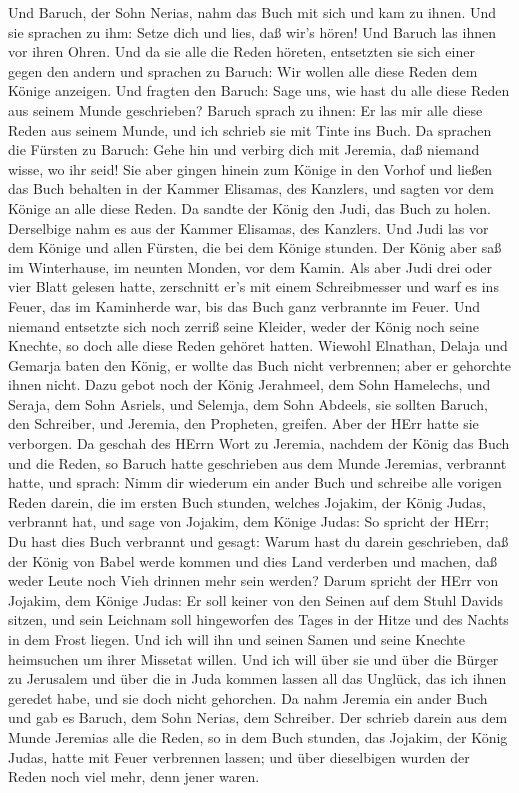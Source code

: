 Und Baruch, der Sohn Nerias, nahm das Buch mit sich und kam zu ihnen.
 Und sie sprachen zu ihm: Setze dich und lies, daß wir's
hören! Und Baruch las ihnen vor ihren Ohren.  Und da sie
alle die Reden höreten, entsetzten sie sich einer gegen den andern und
sprachen zu Baruch: Wir wollen alle diese Reden dem Könige anzeigen.
 Und fragten den Baruch: Sage uns, wie hast du alle diese
Reden aus seinem Munde geschrieben?  Baruch sprach zu
ihnen: Er las mir alle diese Reden aus seinem Munde, und ich schrieb sie
mit Tinte ins Buch.  Da sprachen die Fürsten zu Baruch:
Gehe hin und verbirg dich mit Jeremia, daß niemand wisse, wo ihr seid!
 Sie aber gingen hinein zum Könige in den Vorhof und ließen
das Buch behalten in der Kammer Elisamas, des Kanzlers, und sagten vor
dem Könige an alle diese Reden.  Da sandte der König den
Judi, das Buch zu holen. Derselbige nahm es aus der Kammer Elisamas, des
Kanzlers. Und Judi las vor dem Könige und allen Fürsten, die bei dem
Könige stunden.  Der König aber saß im Winterhause, im
neunten Monden, vor dem Kamin.  Als aber Judi drei oder
vier Blatt gelesen hatte, zerschnitt er's mit einem Schreibmesser und
warf es ins Feuer, das im Kaminherde war, bis das Buch ganz verbrannte
im Feuer.  Und niemand entsetzte sich noch zerriß seine
Kleider, weder der König noch seine Knechte, so doch alle diese Reden
gehöret hatten.  Wiewohl Elnathan, Delaja und Gemarja baten
den König, er wollte das Buch nicht verbrennen; aber er gehorchte ihnen
nicht.  Dazu gebot noch der König Jerahmeel, dem Sohn
Hamelechs, und Seraja, dem Sohn Asriels, und Selemja, dem Sohn Abdeels,
sie sollten Baruch, den Schreiber, und Jeremia, den Propheten, greifen.
Aber der HErr hatte sie verborgen.  Da geschah des HErrn
Wort zu Jeremia, nachdem der König das Buch und die Reden, so Baruch
hatte geschrieben aus dem Munde Jeremias, verbrannt hatte, und sprach:
 Nimm dir wiederum ein ander Buch und schreibe alle vorigen
Reden darein, die im ersten Buch stunden, welches Jojakim, der König
Judas, verbrannt hat,  und sage von Jojakim, dem Könige
Judas: So spricht der HErr; Du hast dies Buch verbrannt und gesagt:
Warum hast du darein geschrieben, daß der König von Babel werde kommen
und dies Land verderben und machen, daß weder Leute noch Vieh drinnen
mehr sein werden?  Darum spricht der HErr von Jojakim, dem
Könige Judas: Er soll keiner von den Seinen auf dem Stuhl Davids sitzen,
und sein Leichnam soll hingeworfen des Tages in der Hitze und des Nachts
in dem Frost liegen.  Und ich will ihn und seinen Samen und
seine Knechte heimsuchen um ihrer Missetat willen. Und ich will über sie
und über die Bürger zu Jerusalem und über die in Juda kommen lassen all
das Unglück, das ich ihnen geredet habe, und sie doch nicht gehorchen.
 Da nahm Jeremia ein ander Buch und gab es Baruch, dem Sohn
Nerias, dem Schreiber. Der schrieb darein aus dem Munde Jeremias alle
die Reden, so in dem Buch stunden, das Jojakim, der König Judas, hatte
mit Feuer verbrennen lassen; und über dieselbigen wurden der Reden noch
viel mehr, denn jener waren.

